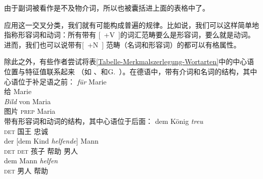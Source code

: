 \noindent
由于副词被看作是不及物介词\label{Seite-Adverbien-PP}，所以也被囊括进上面的表格中了。

应用这一交叉分类，我们就有可能构成普遍的规律。比如说，我们可以这样简单地指称形容词和动词：所有带有 [~+V~]的词汇范畴要么是形容词，要么就是动词。进而，我们也可以说带有[~+N~] 范畴（名词和形容词）的都可以有格属性。

除此之外，有些作者尝试将表\ref{Tabelle-Merkmalszerlegung-Wortarten}中的中心语位置与特征值联系起来
（如 \citealp[]{Grewendorf88a}、\citealp[]{Haftka96a}和G.\ \citealp[]{GMueller2011a}）。在德语中，带有介词和名词的结构，其中心语位于补足语之前：
\eal
\ex
\gll \emph{für} Marie\\
	 给 Marie\\
\ex 
\gll \emph{Bild} von Maria\\
	 图片 \textsc{prep} Maria\\
\zl
带有形容词和动词的结构，其中心语位于后面：
\eal
\ex 
\gll dem König \emph{treu}\\
     \textsc{det} 国王 忠诚\\
\ex 
\gll der [dem Kind \emph{helfende}] Mann\\
     \textsc{det} \spacebr\textsc{det} 孩子 帮助 男人\\
\ex 
\gll dem Mann \emph{helfen}\\
      \textsc{det} 男人 帮助\\
